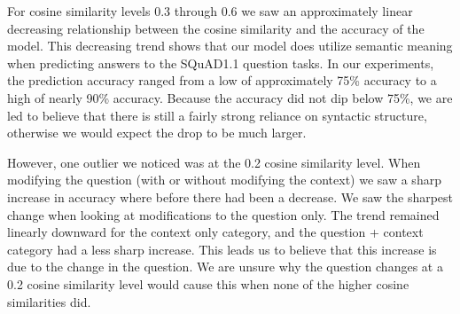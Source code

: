 \documentclass[11pt,a4paper]{article}
\begin{document}
For cosine similarity levels 0.3 through 0.6 we saw an approximately linear decreasing relationship between the cosine similarity and the accuracy of the model. This decreasing trend shows that our model does utilize semantic meaning when predicting answers to the SQuAD1.1 question tasks. In our experiments, the prediction accuracy ranged from a low of approximately 75\% accuracy to a high of nearly 90\% accuracy. Because the accuracy did not dip below 75\%, we are led to believe that there is still a fairly strong reliance on syntactic structure, otherwise we would expect the drop to be much larger.

However, one outlier we noticed was at the 0.2 cosine similarity level. When modifying the question (with or without modifying the context) we saw a sharp increase in accuracy where before there had been a decrease. We saw the sharpest change when looking at modifications to the question only. The trend remained linearly downward for the context only category, and the question + context category had a less sharp increase. This leads us to believe that this increase is due to the change in the question. We are unsure why the question changes at a 0.2 cosine similarity level would cause this when none of the higher cosine similarities did.
\end{document}
